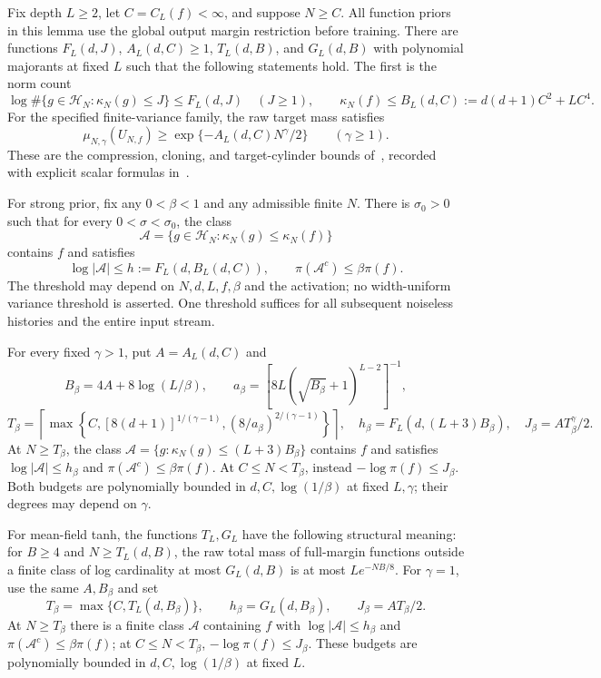 \begin{lemma}
\label{lem:neural-inputs}
Fix depth $L\ge2$, let $C=C_L(f)<\infty$, and suppose $N\ge C$.
All function priors in this lemma use the global output margin restriction
before training. There are functions $F_L(d,J)$, $A_L(d,C)\ge1$,
$T_L(d,B)$, and $G_L(d,B)$ with polynomial majorants at fixed $L$
such that the following statements hold. The first is the norm count
\[
\log\#\{g\in\mathcal H_N:\kappa_N(g)\le J\}\le F_L(d,J)
 \quad(J\ge1),
 \qquad
 \kappa_N(f)\le B_L(d,C):=d(d+1)C^2+LC^4.
\]
For the specified finite-variance family, the raw target mass satisfies
\[
 \mu_{N,\gamma}(U_{N,f})\ge
 \exp\{-A_L(d,C)N^\gamma/2\}\qquad(\gamma\ge1).
\]
These are the compression, cloning, and target-cylinder bounds
of~\cite{strong,above,meanfield}, recorded with explicit scalar formulas
in~\cite{online}.

For strong prior, fix any $0<\beta<1$ and any admissible finite $N$.
There is $\sigma_0>0$ such that for every $0<\sigma<\sigma_0$, the class
\[
 \mathcal A=\{g\in\mathcal H_N:\kappa_N(g)\le\kappa_N(f)\}
\]
contains $f$ and satisfies
\[
 \log|\mathcal A|\le h:=F_L(d,B_L(d,C)),\qquad
 \pi(\mathcal A^c)\le\beta\pi(f).
\]
The threshold may depend on $N,d,L,f,\beta$ and the activation; no
width-uniform variance threshold is asserted. One threshold suffices for
all subsequent noiseless histories and the entire input stream.

For every fixed $\gamma>1$, put $A=A_L(d,C)$ and
\[
 B_\beta=4A+8\log(L/\beta),\qquad
 a_\beta=[8L(\sqrt{B_\beta}+1)^{L-2}]^{-1},
\]
\[
 T_\beta=\left\lceil\max\left\{
 C,[8(d+1)]^{1/(\gamma-1)},(8/a_\beta)^{2/(\gamma-1)}
 \right\}\right\rceil,
 \quad h_\beta=F_L(d,(L+3)B_\beta),
 \quad J_\beta=AT_\beta^\gamma/2.
\]
At $N\ge T_\beta$, the class
$\mathcal A=\{g:\kappa_N(g)\le(L+3)B_\beta\}$ contains $f$ and
satisfies $\log|\mathcal A|\le h_\beta$ and
$\pi(\mathcal A^c)\le\beta\pi(f)$.
At $C\le N<T_\beta$, instead $-\log\pi(f)\le J_\beta$.
Both budgets are polynomially bounded in $d,C,\log(1/\beta)$ at fixed
$L,\gamma$; their degrees may depend on $\gamma$.

For mean-field tanh, the functions $T_L,G_L$ have the following
structural meaning: for $B\ge4$ and $N\ge T_L(d,B)$, the raw total
mass of full-margin functions outside a finite class of log cardinality
at most $G_L(d,B)$ is at most $L e^{-NB/8}$.
For $\gamma=1$, use the same $A,B_\beta$ and set
\[
 T_\beta=\max\{C,T_L(d,B_\beta)\},\qquad
 h_\beta=G_L(d,B_\beta),\qquad J_\beta=AT_\beta/2.
\]
At $N\ge T_\beta$ there is a finite class $\mathcal A$ containing $f$
with $\log|\mathcal A|\le h_\beta$ and
$\pi(\mathcal A^c)\le\beta\pi(f)$; at $C\le N<T_\beta$,
$-\log\pi(f)\le J_\beta$. These budgets are polynomially bounded in
$d,C,\log(1/\beta)$ at fixed $L$.
\end{lemma}

